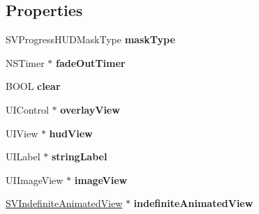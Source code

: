 \subsection*{Properties}
\begin{DoxyCompactItemize}
\item 
\mbox{\label{category_s_v_progress_h_u_d_07_08_abbc5f4e42861008adfcd3b5c38a1b1ad}} 
S\+V\+Progress\+H\+U\+D\+Mask\+Type {\bfseries mask\+Type}
\item 
\mbox{\label{category_s_v_progress_h_u_d_07_08_aeb08fe2aa349ee9001309521938f3374}} 
N\+S\+Timer $\ast$ {\bfseries fade\+Out\+Timer}
\item 
\mbox{\label{category_s_v_progress_h_u_d_07_08_a3a873b89c16f87e52ff0b9a16aac994f}} 
B\+O\+OL {\bfseries clear}
\item 
\mbox{\label{category_s_v_progress_h_u_d_07_08_a9d85b322b24e1a292ce0db3eaebebbef}} 
U\+I\+Control $\ast$ {\bfseries overlay\+View}
\item 
\mbox{\label{category_s_v_progress_h_u_d_07_08_a4b62a98c0d40233cb6bb5ff48243be02}} 
U\+I\+View $\ast$ {\bfseries hud\+View}
\item 
\mbox{\label{category_s_v_progress_h_u_d_07_08_a28fdac0ab6bf30855e98c1df85acc586}} 
U\+I\+Label $\ast$ {\bfseries string\+Label}
\item 
\mbox{\label{category_s_v_progress_h_u_d_07_08_a45a432bcb105f9eb0c00ef1fb05417bd}} 
U\+I\+Image\+View $\ast$ {\bfseries image\+View}
\item 
\mbox{\label{category_s_v_progress_h_u_d_07_08_a49fd2bd289903a21d9370b8f9f20c041}} 
\mbox{\hyperlink{interface_s_v_indefinite_animated_view}{S\+V\+Indefinite\+Animated\+View}} $\ast$ {\bfseries indefinite\+Animated\+View}
\item 
\mbox{\label{category_s_v_progress_h_u_d_07_08_ad8ab4d2b7a86ba3f5386f0faeb72619e}} 

\end{DoxyCompactItemize}
